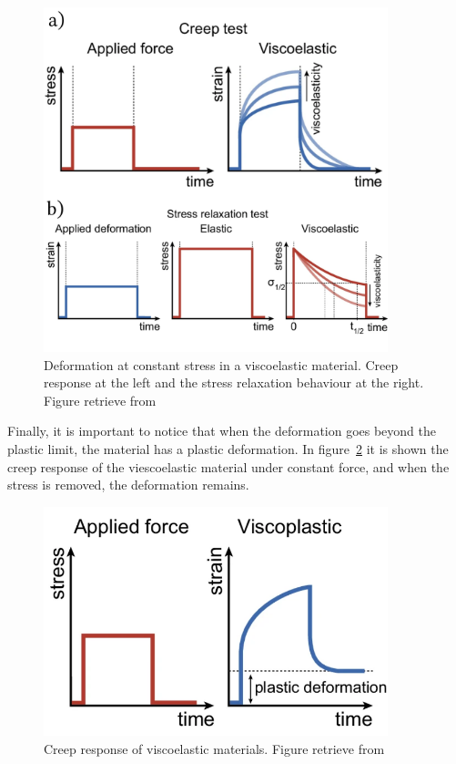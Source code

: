 \begin{figure}[ht!]
    \centering
    \centering
    \includegraphics[width=10cm]{figs/mechResponse/viscoElasticResponse-2.png}
    \caption{Deformation at constant stress in a viscoelastic material.
        Creep response at the left and the stress relaxation behaviour at the right.
        Figure retrieve from\citep{courbotRoleExtracellularMatrix2025}}\label{fig:mechresponse0-b}
\end{figure}

Finally, it is important to notice that when the deformation goes beyond the plastic limit, the material has a plastic deformation.
In figure~\ref{fig:mechresponse0-c} it is shown the creep response of the viescoelastic material under constant force, and when the stress is removed, the deformation remains.

\begin{figure}[ht!]
    \centering
    \centering
    \includegraphics[width=10cm]{figs/mechResponse/viscoElasticResponse-3.png}
    \caption{Creep response of viscoelastic materials. 
        Figure retrieve from\citep{courbotRoleExtracellularMatrix2025}}\label{fig:mechresponse0-c}
\end{figure}

